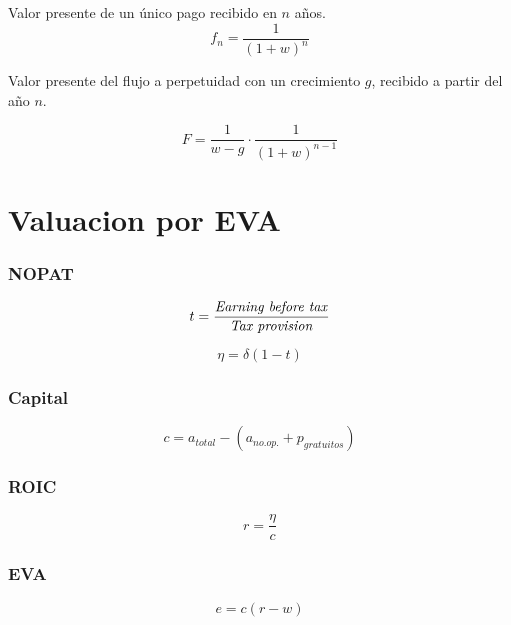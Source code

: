 \begin{multicols}{2}
Valor presente de un único pago recibido en $n$ años.
\begin{equation}
    f_n = \frac{1}{\left(1+w\right)^n}
\end{equation}

Valor presente del flujo a perpetuidad con un crecimiento $g$, recibido a partir del año $n$.

\begin{equation}
    F = \frac{1}{w-g}\cdot\frac{1}{\left(1+w\right)^{n-1}}
\end{equation}



\section{Valuacion por EVA}

\subsubsection*{NOPAT}

\begin{equation}
    t = \frac{\textrm{\textit{Earning before tax}}}{\textrm{\textit{Tax provision}}}
\end{equation}

\begin{equation}
    \eta = \delta(1-t)
\end{equation}

\subsubsection*{Capital}
\begin{equation}
    c = a_{total} - \left(a_{no.op.} + p_{gratuitos} \right)
\end{equation}

\subsubsection*{ROIC}
\begin{equation}
    r = \frac{\eta}{c}
\end{equation}

\subsubsection*{EVA}
\begin{equation}
    e = c(r-w)
\end{equation}


\end{multicols}
